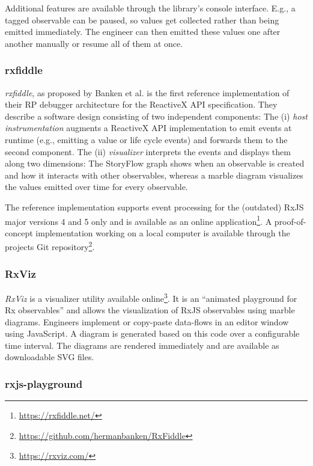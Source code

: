 \documentclass[sigplan,screen,review]{acmart}
\begin{document}
Additional features are available through the library's console interface. E.g., a tagged observable can be paused, so values get collected rather than being emitted immediately. The engineer can then emitted these values one after another manually or resume all of them at once.

\subsubsection{rxfiddle}

\emph{rxfiddle}, as proposed by Banken et al.\cite{10.1145/3180155.3180156} is the first reference implementation of their RP debugger architecture for the ReactiveX API specification. They describe a software design consisting of two independent components: The (i) \emph{host instrumentation} augments a ReactiveX API implementation to emit events at runtime (e.g., emitting a value or life cycle events) and forwards them to the second component. The (ii) \emph{visualizer} interprets the events and displays them along two dimensions: The StoryFlow graph\cite{YWu2013a} shows when an observable is created and how it interacts with other observables, whereas a marble diagram visualizes the values emitted over time for every observable.

The reference implementation supports event processing for the (outdated) RxJS major versions 4 and 5 only and is available as an online application\footnote{\url{https://rxfiddle.net/}}. A proof-of-concept implementation working on a local computer is available through the projects Git repository\footnote{\url{https://github.com/hermanbanken/RxFiddle}}.

\subsubsection{RxViz}

\emph{RxViz} is a visualizer utility available online\footnote{\url{https://rxviz.com/}}. It is an ``animated playground for Rx observables''\cite{rxviz} and allows the visualization of RxJS observables using marble diagrams. Engineers implement or copy-paste data-flows in an editor window using JavaScript. A diagram is generated based on this code over a configurable time interval. The diagrams are rendered immediately and are available as downloadable SVG files.

\subsubsection{rxjs-playground}
\end{document}
